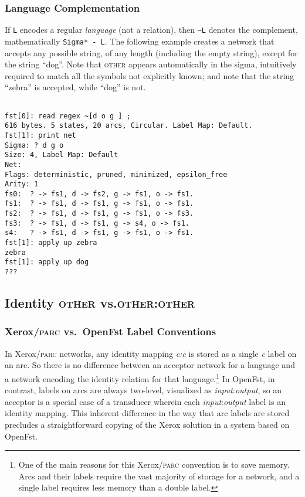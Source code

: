 \documentclass[letterpaper,11pt]{article}
\providecommand{\acro}{}\renewcommand{\acro}{\textsc}
\begin{document}
\subsubsection{Language Complementation}

If \texttt{L} encodes a regular \emph{language} (not a relation), 
then \texttt{\~{}L} denotes
the complement, mathematically \texttt{Sigma* - L}.  The following example creates a
network that accepts any possible string, of any length (including
the empty string), except for the string ``dog''.  Note that
\acro{other} appears automatically in the sigma, intuitively required to match all
the symbols not explicitly known; and note that the string ``zebra'' is accepted, while
``dog'' is not.

\begin{Verbatim}[fontsize=\footnotesize]

fst[0]: read regex ~[d o g ] ;
616 bytes. 5 states, 20 arcs, Circular. Label Map: Default.
fst[1]: print net
Sigma: ? d g o
Size: 4, Label Map: Default
Net: 
Flags: deterministic, pruned, minimized, epsilon_free
Arity: 1
fs0:  ? -> fs1, d -> fs2, g -> fs1, o -> fs1.
fs1:  ? -> fs1, d -> fs1, g -> fs1, o -> fs1.
fs2:  ? -> fs1, d -> fs1, g -> fs1, o -> fs3.
fs3:  ? -> fs1, d -> fs1, g -> s4, o -> fs1.
s4:   ? -> fs1, d -> fs1, g -> fs1, o -> fs1.
fst[1]: apply up zebra
zebra
fst[1]: apply up dog
???
\end{Verbatim}



\subsection{Identity \acro{other} vs.\@ \acro{other}:\acro{other}}

\subsubsection{Xerox/\acro{parc} vs.~OpenFst Label Conventions}

In Xerox/\acro{parc} networks, any identity mapping \emph{c:c} is  
stored as a single \emph{c} label on an arc.  So there is no difference  
between an acceptor network for a language and a network encoding the  
identity relation for that language.\footnote{One of the main reasons
for this Xerox/\acro{parc} convention is to save memory.  Arcs and
	their labels require the
	vast majority of storage for a network, and a single label
	requires less memory than a double label.}  In OpenFst, 
	in contrast, labels  
on arcs are always two-level, visualized as
\emph{input}:\emph{output}, so an acceptor is a special  
case of a transducer wherein each \emph{input}:\emph{output} 
label is an identity  
mapping.  This inherent difference in the way that 
arc labels are stored precludes a straightforward copying of the Xerox
solution in a system based on OpenFst.
\end{document}
